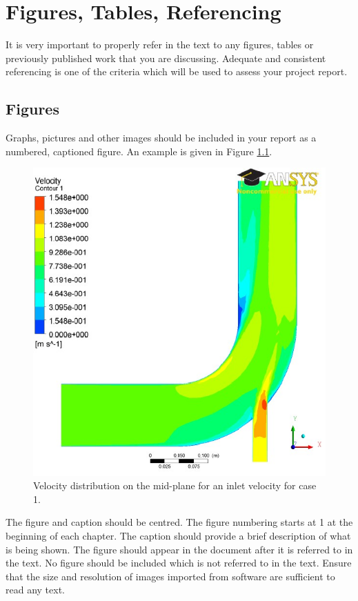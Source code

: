 \chapter{Figures, Tables, Referencing}

It is very important to properly refer in the text to any figures, tables or previously published work that you are discussing. Adequate and consistent referencing is one of the criteria which will be used to assess your project report.

\section{Figures}
Graphs, pictures and other images should be included in your report as a numbered, captioned figure. An example is given in Figure \ref{veldis}.

\begin{figure}[h]
      \centering
      \includegraphics{background/5e1-1.pdf}
      \caption{Velocity distribution on the mid-plane for an inlet velocity for case 1.}
      \label{veldis}
\end{figure}

The figure and caption should be centred. The figure numbering starts at 1 at the beginning of each chapter. The caption should provide a brief description of what is being shown. The figure should appear in the document after it is referred to in the text. No figure should be included which is not referred to in the text. Ensure that the size and resolution of images imported from software are sufficient to read any text.

